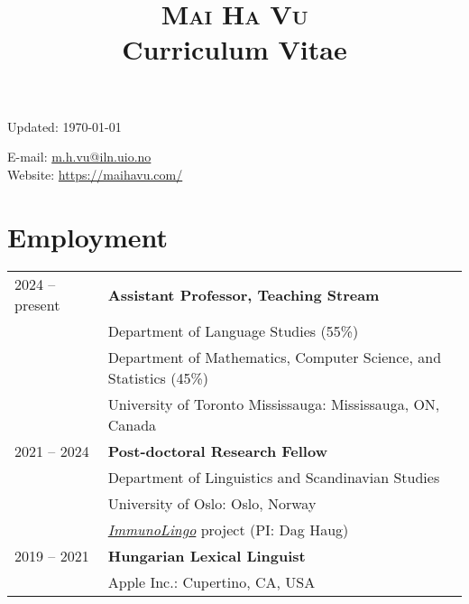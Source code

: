 \documentclass[11pt]{article} %
\title{\textsc{Mai Ha Vu} \\ {\large Curriculum Vitae}}
\date{}
\begin{document}
\maketitle 

\vskip -50pt
\begin{minipage}[ht]{0.65\textwidth}
Updated: \today \\
\end{minipage}
\begin{minipage}[ht]{0.60\textwidth}
\begin{flushleft}

E-mail: \href{mailto:m.h.vu@iln.uio.no}{m.h.vu@iln.uio.no} \\
Website: \href{https://maihavu.com/}{https://maihavu.com/}
\end{flushleft}
\end{minipage}



\section*{Employment}

\begin{tabular}{p{1in} l}
	2024 -- present & \textbf{Assistant Professor, Teaching Stream} \\
	& Department of Language Studies (55\%) \\
	& Department of Mathematics, Computer Science, and Statistics (45\%) \\
	& University of Toronto Mississauga: Mississauga, ON, Canada \\
	2021 -- 2024 & \textbf{Post-doctoral Research Fellow} \\
	& Department of Linguistics and Scandinavian Studies\\
	& University of Oslo: Oslo, Norway \\
	& \href{https://www.uio.no/english/research/strategic-research-areas/life-science/research/convergence-environments/immunolingo/}{\textit{ImmunoLingo}} project (PI: Dag Haug)\\
	2019 -- 2021 & \textbf{Hungarian Lexical Linguist} \\
	& Apple Inc.: Cupertino, CA, USA \\[2pt]
\end{tabular}
\end{document}
